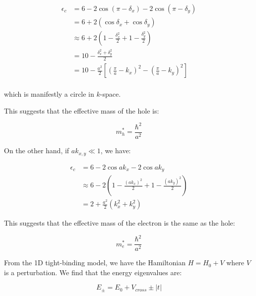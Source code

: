 \documentclass[12pt]{article}
\begin{document}
\begin{equation}
    \begin{split}
        \epsilon_{c} &= 6 - 2\cos{(\pi - \delta_{x})} - 2\cos{(\pi - \delta_{y})} \\
        &= 6 + 2 (\cos{\delta_{x}} + \cos{\delta_{y}}) \\
        &\approx 6 + 2 \left( 1 - \frac{\delta_{x}^{2}}{2} + 1 - \frac{\delta_{y}^{2}}{2} \right) \\
        &= 10 - \frac{\delta_{x}^{2} + \delta_{y}^{2}}{2} \\
        &= 10 - \frac{a^{2}}{2} \left[ \left( \frac{\pi}{a} - k_{x} \right)^{2} - \left( \frac{\pi}{a} - k_{y} \right)^{2} \right] \\
    \end{split}
\end{equation}

which is manifestly a circle in $k$-space.

This suggests that the effective mass of the hole is:

\begin{equation}
    m_{h}^{*} = \frac{\hbar^{2}}{a^{2}}
\end{equation}

On the other hand, if $ak_{x, y} \ll 1$, we have:

\begin{equation}
    \begin{split}
        \epsilon_{c} &= 6 - 2\cos{ak_{x}} - 2\cos{ak_{y}} \\
        &\approx 6 - 2 \left( 1 - \frac{(ak_{x})^{2}}{2} + 1 - \frac{(ak_{y})^{2}}{2} \right) \\
        &= 2 + \frac{a^{2}}{2} (k_{x}^{2} + k_{y}^{2})
    \end{split}
\end{equation}

This suggests that the effective mass of the electron is the same as the hole:

\begin{equation}
    m_{e}^{*} = \frac{\hbar^{2}}{a^{2}}
\end{equation}

From the 1D tight-binding model, we have the Hamiltonian $H = H_{0} + V$ where $V$ is a perturbation. We find that the energy eigenvalues are:

\begin{equation}
    E_{\pm} = E_{0} + V_{cross} \pm \left\lvert t \right\rvert
\end{equation}
\end{document}
